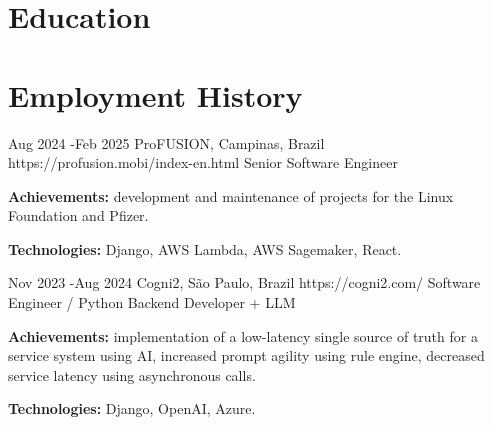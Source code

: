 \documentclass[10pt]{article} %
\begin{document}
\section{Education}



\section{Employment History}

\job
{Aug 2024 -}{Feb 2025}
{ProFUSION, Campinas, Brazil}
{https://profusion.mobi/index-en.html}
{Senior Software Engineer}
{\rule{0mm}{2mm}\textbf{Achievements:} development and maintenance of projects for the Linux Foundation and Pfizer.\\
\rule{0mm}{3mm}\textbf{Technologies:} Django, AWS Lambda, AWS Sagemaker, React.}


\job
{Nov 2023 -}{Aug 2024}
{Cogni2, São Paulo, Brazil}
{https://cogni2.com/}
{Software Engineer / Python Backend Developer + LLM}
{\rule{0mm}{2mm}\textbf{Achievements:} implementation of a low-latency single source of truth for a service system using AI, increased prompt agility using rule engine, decreased service latency using asynchronous calls.\\
\rule{0mm}{3mm}\textbf{Technologies:} Django, OpenAI, Azure.}
\end{document}
